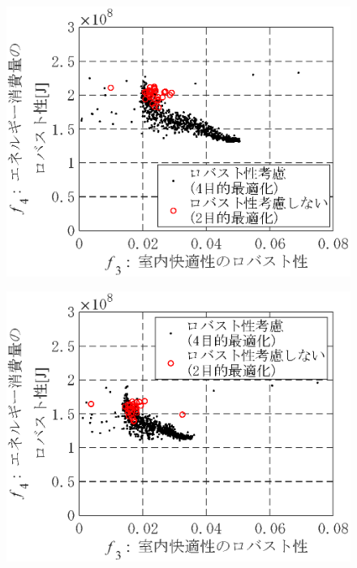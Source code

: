 \begin{figure}[htbp]
\begin{center}
\begin{minipage}{0.3\textwidth}
\begin{center}
            \end{center}
        \end{minipage}
        \begin{minipage}{0.3\textwidth}
            \begin{center}
                \includegraphics[width=1\textwidth,keepaspectratio=true]{fig/robust_result_pareto_f3f4_10_3.eps}\\\vspace{-3mm}{\small (c)上方誤差があった場合3}
            \end{center}
        \end{minipage}
        \begin{minipage}{0.3\textwidth}
            \begin{center}
                \includegraphics[width=1\textwidth,keepaspectratio=true]{fig/robust_result_pareto_f3f4_10_4.eps}\\\vspace{-3mm}{\small (d)上方誤差があった場合4}

\end{center}
\end{minipage}
\end{center}
\end{figure}
